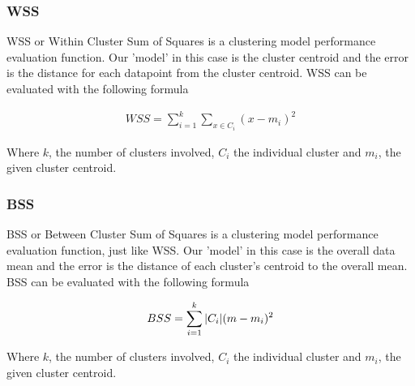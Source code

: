 \documentclass[11pt]{article}
\begin{document}
			\subsubsection*{WSS}
				WSS or  Within Cluster Sum of Squares is a clustering model performance evaluation function. Our 'model' in this case is the cluster centroid and the error is the distance for each datapoint from the cluster centroid. WSS can be evaluated with the following formula\cite{???}
				\iftrue
				\begin{align}
					WSS = \sum_{i=1}^{k}{\sum_{x\in{C_i}}^{}{(x-m_i)^2}}	
				\end{align}
				\fi
				Where $k$, the number of clusters involved, $C_i$ the individual cluster and $m_i$, the given cluster centroid.
				\subsubsection*{BSS}
				BSS or  Between Cluster Sum of Squares is a clustering model performance evaluation function, just like WSS. Our 'model' in this case is the overall data mean and the error is the distance of each cluster's centroid to the overall mean. BSS can be evaluated with the following formula\cite{???}
				\iftrue
				\begin{align}
					BSS = \sum_{i=1}^{k}{\abs{C_i}(m-m_i)^2}	
				\end{align}
				\fi
				Where $k$, the number of clusters involved, $C_i$ the individual cluster and $m_i$, the given cluster centroid.
\end{document}
